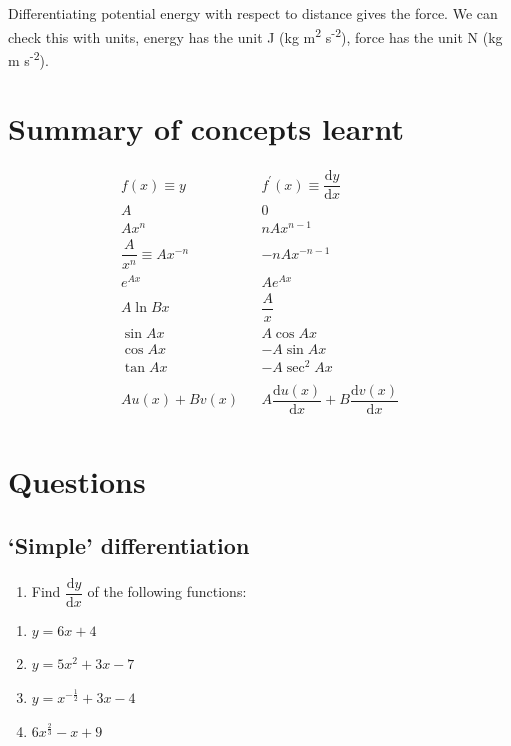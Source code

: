 \documentclass[
]{book}
\providecommand{\tightlist}{%
  \setlength{\itemsep}{0pt}\setlength{\parskip}{0pt}}
\begin{document}
Differentiating potential energy with respect to distance gives the force. We can check this with units, energy has the unit J (kg m\textsuperscript{2} s\textsuperscript{-2}), force has the unit N (kg m s\textsuperscript{-2}).

\hypertarget{summary-of-concepts-learnt-1}{%
\section{Summary of concepts learnt}\label{summary-of-concepts-learnt-1}}

\begin{equation*}
\begin{array}{ccc}
  f(x) \equiv y & & f^{\prime}(x) \equiv \dfrac{\textrm{d}y}{\textrm{d}x}\\
  \hline
A & &0 \\
 Ax^n & &nAx^{n-1} \\
 \dfrac{A}{x^n} \equiv A x^{-n} & &-nA x^{-n-1} \\
e^{Ax} & &Ae^{Ax} \\
A \ln Bx & &\dfrac{A}{x} \\
\sin Ax & &A\cos Ax \\
\cos Ax & &-A\sin Ax \\
\tan Ax & &-A\sec^2 Ax \\
\\
Au(x) + Bv(x) & &A\dfrac{\textrm{d}u(x)}{\textrm{d}x} + B\dfrac{\textrm{d}v(x)}{\textrm{d}x} \\
\end{array}
\end{equation*}

\hypertarget{sec:Questions4}{%
\section{Questions}\label{sec:Questions4}}

\hypertarget{simple-differentiation}{%
\subsection{`Simple' differentiation}\label{simple-differentiation}}

\begin{enumerate}
\def\labelenumi{\arabic{enumi}.}
\tightlist
\item
  Find \(\dfrac{\textrm{d}y}{\textrm{d}x}\) of the following functions:
\end{enumerate}

\begin{enumerate}
\def\labelenumi{\alph{enumi}.}
\tightlist
\item
  \(y = 6x + 4\)
\item
  \(y = 5x^2+ 3x-7\)
\item
  \(y = x^{-\frac{1}{2}}+ 3x-4\)
\item
  \(6x^{\frac{2}{3}}-x+9\)
\end{enumerate}
\end{document}
